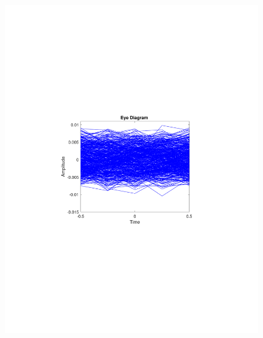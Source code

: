 \begin{refsection}
\begin{figure}[H]
\begin{minipage}{0.30\textwidth}
		\includegraphics[clip, trim=4cm 8cm 4cm 8cm, width=1\textwidth]{./sdf/m_qam_system/figures/expResults/homodyne/0_eye_4GBdInSig13dB_bfFec.pdf}
		\label{fig:4GBdSpecBefFecHm}
	\end{minipage}
	\begin{minipage}{0.30\textwidth}
		\centering

\end{minipage}
\end{figure}
\end{refsection}
